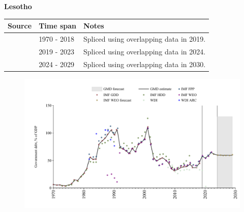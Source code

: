 \documentclass[12pt,a4paper,landscape]{article}
\begin{document}
\begin{adjustbox}{max totalsize={\paperwidth}{\paperheight},center}
\begin{minipage}[t][\textheight][t]{\textwidth}
\vspace*{0.5cm}
{}
\begin{center}
{\Large\bfseries Lesotho}
\end{center}
\vspace{0.5cm}
\begin{table}[H]
\centering
\small
\begin{tabular}{|l|l|l|}
\hline
\textbf{Source} & \textbf{Time span} & \textbf{Notes} \\
\hline
\rowcolor{white}\cite{IMF_GDD}& 1970 - 2018 &Spliced using overlapping data in 2019.\\
\rowcolor{lightgray}\cite{IMF_FPP}& 2019 - 2023 &Spliced using overlapping data in 2024.\\
\rowcolor{white}\cite{IMF_WEO_forecast}& 2024 - 2029 &Spliced using overlapping data in 2030.\\
\hline
\end{tabular}
\end{table}
\begin{figure}[H]
\centering
\includegraphics[width=\textwidth,height=0.6\textheight,keepaspectratio]{graphs/LSO_govdebt_GDP.pdf}
\end{figure}
\end{minipage}
\end{adjustbox}
\end{document}
